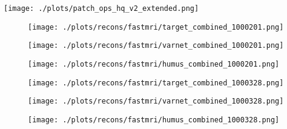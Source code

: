 \begin{center}
		\centering
		\texttt{[image: ./plots/patch\_ops\_hq\_v2\_extended.png]}
\end{center}

\begin{figure}[h!]
	\begin{minipage}[b]{0.33\textwidth}
		\centering
		\texttt{[image: ./plots/recons/fastmri/target\_combined\_1000201.png]}
		\addtocounter{figure}{-1}
		\captionsetup{labelformat=empty}
	\end{minipage}
	\begin{minipage}[b]{0.33\textwidth}
		\centering
		\texttt{[image: ./plots/recons/fastmri/varnet\_combined\_1000201.png]}
		\addtocounter{figure}{-1}
		\captionsetup{labelformat=empty}
	\end{minipage}
	\begin{minipage}[b]{0.33\textwidth}
		\centering
		\texttt{[image: ./plots/recons/fastmri/humus\_combined\_1000201.png]}
		\addtocounter{figure}{-1}
		\captionsetup{labelformat=empty}
	\end{minipage} \par\vspace{-0.96cm}
	\begin{minipage}[b]{0.33\textwidth}
		\centering
		\texttt{[image: ./plots/recons/fastmri/target\_combined\_1000328.png]}
		\addtocounter{figure}{-1}
		\captionsetup{labelformat=empty}
	\end{minipage}
	\begin{minipage}[b]{0.33\textwidth}
		\centering
		\texttt{[image: ./plots/recons/fastmri/varnet\_combined\_1000328.png]}
		\addtocounter{figure}{-1}
		\captionsetup{labelformat=empty}
	\end{minipage}
	\begin{minipage}[b]{0.33\textwidth}
		\centering
		\texttt{[image: ./plots/recons/fastmri/humus\_combined\_1000328.png]}
		\addtocounter{figure}{-1}
		\captionsetup{labelformat=empty}
	\end{minipage} \par\vspace{-0.96cm}
	\begin{minipage}[b]{0.33\textwidth}
		\centering

\end{minipage}
\end{figure}
